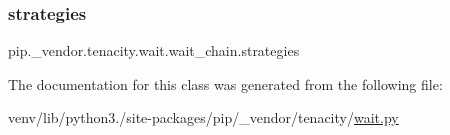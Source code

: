 \subsubsection{\texorpdfstring{strategies}{strategies}}
{\footnotesize\ttfamily pip.\+\_\+vendor.\+tenacity.\+wait.\+wait\+\_\+chain.\+strategies}



The documentation for this class was generated from the following file\+:\begin{DoxyCompactItemize}
\item 
venv/lib/python3./site-\/packages/pip/\+\_\+vendor/tenacity/\hyperlink{tenacity_2wait_8py}{wait.\+py}\end{DoxyCompactItemize}
